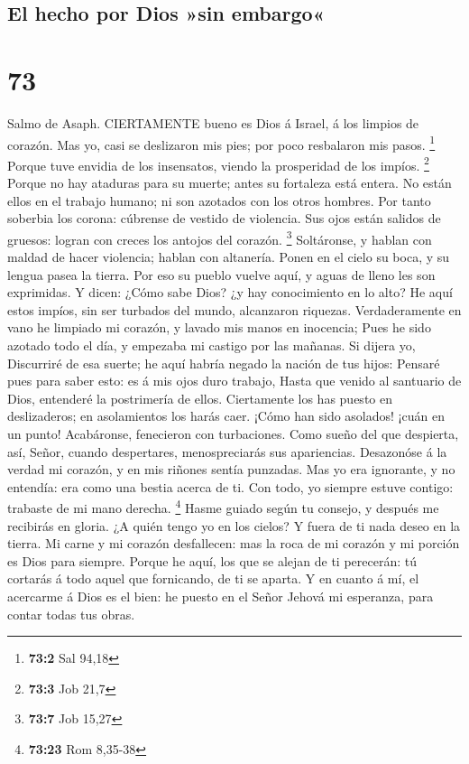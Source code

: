 \hypertarget{el-hecho-por-dios-sin-embargo}{%
\subsection{El hecho por Dios »sin
embargo«}\label{el-hecho-por-dios-sin-embargo}}

\hypertarget{section-72}{%
\section{73}\label{section-72}}

 Salmo de Asaph. CIERTAMENTE bueno es Dios á Israel, á los
limpios de corazón.  Mas yo, casi se deslizaron mis pies;
por poco resbalaron mis pasos. \footnote{\textbf{73:2} Sal 94,18}
 Porque tuve envidia de los insensatos, viendo la
prosperidad de los impíos. \footnote{\textbf{73:3} Job 21,7}
 Porque no hay ataduras para su muerte; antes su fortaleza
está entera.  No están ellos en el trabajo humano; ni son
azotados con los otros hombres.  Por tanto soberbia los
corona: cúbrense de vestido de violencia.  Sus ojos están
salidos de gruesos: logran con creces los antojos del corazón.
\footnote{\textbf{73:7} Job 15,27}  Soltáronse, y hablan con
maldad de hacer violencia; hablan con altanería.  Ponen en
el cielo su boca, y su lengua pasea la tierra.  Por eso su
pueblo vuelve aquí, y aguas de lleno les son exprimidas.  Y
dicen: ¿Cómo sabe Dios? ¿y hay conocimiento en lo alto?  He
aquí estos impíos, sin ser turbados del mundo, alcanzaron riquezas.
 Verdaderamente en vano he limpiado mi corazón, y lavado
mis manos en inocencia;  Pues he sido azotado todo el día,
y empezaba mi castigo por las mañanas.  Si dijera yo,
Discurriré de esa suerte; he aquí habría negado la nación de tus hijos:
 Pensaré pues para saber esto: es á mis ojos duro trabajo,
 Hasta que venido al santuario de Dios, entenderé la
postrimería de ellos.  Ciertamente los has puesto en
deslizaderos; en asolamientos los harás caer.  ¡Cómo han
sido asolados! ¡cuán en un punto! Acabáronse, fenecieron con
turbaciones.  Como sueño del que despierta, así, Señor,
cuando despertares, menospreciarás sus apariencias. 
Desazonóse á la verdad mi corazón, y en mis riñones sentía punzadas.
 Mas yo era ignorante, y no entendía: era como una bestia
acerca de ti.  Con todo, yo siempre estuve contigo:
trabaste de mi mano derecha. \footnote{\textbf{73:23} Rom 8,35-38}
 Hasme guiado según tu consejo, y después me recibirás en
gloria.  ¿A quién tengo yo en los cielos? Y fuera de ti
nada deseo en la tierra.  Mi carne y mi corazón
desfallecen: mas la roca de mi corazón y mi porción es Dios para
siempre.  Porque he aquí, los que se alejan de ti
perecerán: tú cortarás á todo aquel que fornicando, de ti se aparta.
 Y en cuanto á mí, el acercarme á Dios es el bien: he
puesto en el Señor Jehová mi esperanza, para contar todas tus obras.

